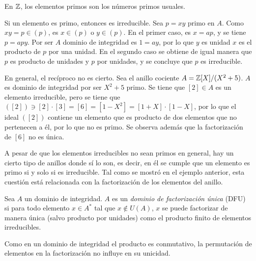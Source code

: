 \begin{obss}
        \item En $\mathbb{Z}$, los elementos primos son los números primos usuales.
        \item Si un elemento es primo, entonces es irreducible. Sea $p = xy$ primo en $A$. Como $xy = p \in (p)$, es $x\in (p)$ o $y\in (p)$. En el primer caso, es $x = ap$, y se tiene $p = apy$. Por ser $A$ dominio de integridad es $1 = ay$, por lo que $y$ es unidad $x$ es el producto de $p$ por una unidad. En el segundo caso se obtiene de igual manera que $p$ es producto de unidades y $p$ por unidades, y se concluye que $p$ es irreducible.
        \item En general, el recíproco no es cierto. Sea el anillo cociente $ A = \mathbb{Z}[X]/(X^2 + 5)$. $A$ es dominio de integridad por ser $X^2 + 5$ primo. Se tiene que $[2]\in A$ es un elemento irreducible, pero se tiene que $([2])\ni [2]\cdot[3] =[6] = [1-X^2] = [1 + X]\cdot [1-X]$, por lo que el ideal $([2])$ contiene un elemento que es producto de dos elementos que no pertenecen a él, por lo que no es primo. Se observa además que la factorización de $[6]$ no es única.
\end{obss}

    A pesar de que los elementos irreducibles no sean primos en general, hay un cierto tipo de anillos donde sí lo son, es decir, en él se cumple que un elemento es primo si y solo si es irreducible. Tal como se mostró en el ejemplo anterior, esta cuestión está relacionada con la factorización de los elementos del anillo.

\begin{deff}{\cite[p.~37]{Rosenberger}}
    Sea $A$ un dominio de integridad. $A$ es un \textit{dominio de factorización única} (DFU) si para todo elemento $x\in A^*$ tal que $x\not\in U(A)$, $x$ se puede factorizar de manera única (salvo producto por unidades) como el producto finito de elementos irreducibles.
\end{deff}

\begin{obs}
    Como en un dominio de integridad el producto es conmutativo, la permutación de elementos en la factorización no influye en su unicidad.
\end{obs}

